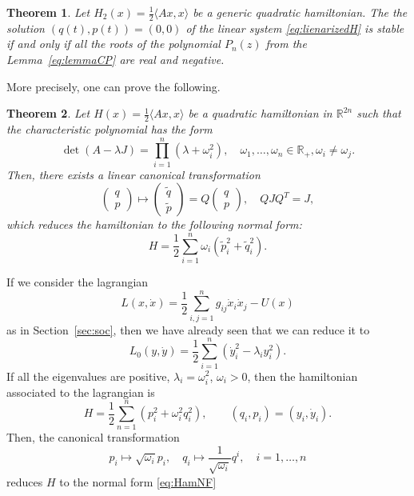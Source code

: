 \documentclass[english,fontsize=11pt,paper=a5,oneside]{scrbook}
\newcommand{\R}{\mathbb{R}}
\newcommand{\lag}{\langle}
\newcommand{\rag}{\rangle}
\newtheorem{theorem}{Theorem}[chapter]
\theoremstyle{definition}
\newenvironment{example}
  {\pushQED{\qed}\renewcommand{\qedsymbol}{$\lozenge$}\examplex}
  {\popQED\endexamplex}
\begin{document}
\begin{theorem}
  Let $H_2(x) = \frac12\lag Ax,x\rag$ be a generic quadratic hamiltonian. The the solution $(q(t), p(t)) = (0,0)$ of the linear system \eqref{eq:lienarizedH} is stable if and only if all the roots of the polynomial $P_n(z)$ from the Lemma~\ref{eq:lemmaCP} are real and negative.
\end{theorem}

More precisely, one can prove the following.
\begin{theorem}
  Let $H(x) = \frac12\lag Ax,x \rag$ be a quadratic hamiltonian in $\R^{2n}$
  such that the characteristic polynomial has the form
  \begin{equation}
    \det(A-\lambda J) = \prod_{i=1}^n(\lambda + \omega_i^2), \quad \omega_1, \ldots, \omega_n \in \R_+, \omega_i\neq\omega_j.
  \end{equation}
  Then, there exists a linear canonical transformation
  \begin{equation}
    \begin{pmatrix}
      q \\ p
    \end{pmatrix}
    \mapsto
    \begin{pmatrix}
      \widetilde q \\ \widetilde p
    \end{pmatrix}
    = Q
    \begin{pmatrix}
      q \\ p
    \end{pmatrix},
    \quad QJQ^T = J,
  \end{equation}
  which reduces the hamiltonian to the following \emph{normal form}:
  \begin{equation}\label{eq:HamNF}
    H = \frac12 \sum_{i=1}^n \omega_i(\widetilde p_i^2 + \widetilde q_i^2).
  \end{equation}
\end{theorem}

\begin{example}
  If we consider the lagrangian
  \begin{equation}
    L(x,\dot x) = \frac12 \sum_{i,j=1}^n g_{ij}\dot x_i \dot x_j - U(x)
  \end{equation}
  as in Section~\ref{sec:soc}, then we have already seen that we can reduce it to
  \begin{equation}
    L_0(y,\dot y) = \frac12 \sum_{i=1}^n(\dot y_i^2 - \lambda_i y_i^2).
  \end{equation}
  If all the eigenvalues are positive, $\lambda_i = \omega_i^2$, $\omega_i > 0$, then the hamiltonian associated to the lagrangian is
  \begin{equation}
    H = \frac12 \sum_{n=1}^n(p_i^2 + \omega_i^2 q_i^2), \qquad (q_i, p_i) = (y_i, \dot y_i).
  \end{equation}
  Then, the canonical transformation
  \begin{equation}
    p_i \mapsto \sqrt{\omega_i}p_i, \quad q_i \mapsto \frac{1}{\sqrt{\omega_i}}q^i, \quad i=1,\ldots,n
  \end{equation}
  reduces $H$ to the normal form \eqref{eq:HamNF}
\end{example}
\end{document}

